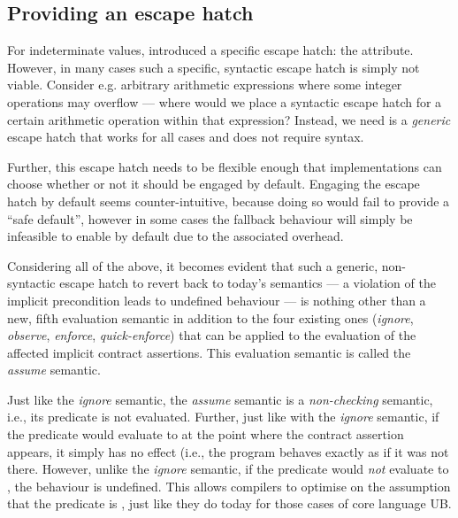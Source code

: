 \subsection{Providing an escape hatch}
\label{assume}

For indeterminate values, \cite{P2795R5} introduced a specific escape hatch: the \tcode{[[indeterminate]]} attribute. However, in many cases such a specific, syntactic escape hatch is simply not viable. Consider e.g. arbitrary arithmetic expressions where some integer operations may overflow --- where would we place a syntactic escape hatch for a certain arithmetic operation within that expression? Instead, we need is a \emph{generic} escape hatch that works for all cases and does not require syntax.

Further, this escape hatch needs to be flexible enough that implementations can choose whether or not it should be engaged by default. Engaging the escape hatch by default seems counter-intuitive, because doing so would fail to provide a ``safe default'', however in some cases the fallback behaviour will simply be infeasible to enable by default due to the associated overhead.

Considering all of the above, it becomes evident that such a generic, non-syntactic escape hatch to revert back to today's semantics --- a violation of the implicit precondition leads to undefined behaviour --- is nothing other than a new, fifth evaluation semantic in addition to the four existing ones (\emph{ignore}, \emph{observe}, \emph{enforce}, \emph{quick-enforce}) that can be applied to the evaluation of the affected implicit contract assertions. This evaluation semantic is called the \emph{assume} semantic.

Just like the \emph{ignore} semantic, the \emph{assume} semantic is a \emph{non-checking} semantic, i.e., its predicate is not evaluated. Further, just like with the \emph{ignore} semantic, if the predicate would  evaluate to  at the point where the contract assertion appears, it simply has no effect (i.e., the program behaves exactly as if it was not there. However, unlike the \emph{ignore} semantic, if the predicate would \emph{not} evaluate to , the behaviour is undefined. This allows compilers to optimise on the assumption that the predicate is , just like they do today for those cases of core language UB.

